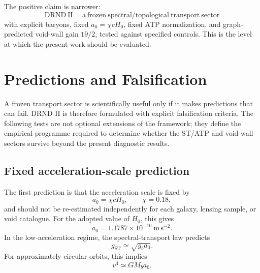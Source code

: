 \documentclass[12pt]{iopart}
\begin{document}
The positive claim is narrower:
\begin{equation}
\mathrm{DRND\ II}
=
\mathrm{a\ frozen\ spectral/topological\ transport\ sector}
\end{equation}
with explicit baryons, fixed \(a_0=\chi cH_0\), fixed ATP normalization, and graph-predicted void-wall gain \(19/2\), tested against specified controls. This is the level at which the present work should be evaluated.

\section{Predictions and Falsification}
\label{sec:falsification}

A frozen transport sector is scientifically useful only if it makes predictions that can fail. DRND II is therefore formulated with explicit falsification criteria. The following tests are not optional extensions of the framework; they define the empirical programme required to determine whether the ST/ATP and void-wall sectors survive beyond the present diagnostic results.

\subsection{Fixed acceleration-scale prediction}

The first prediction is that the acceleration scale is fixed by
\begin{equation}
a_0=\chi cH_0,
\qquad
\chi=0.18,
\end{equation}
and should not be re-estimated independently for each galaxy, lensing sample, or void catalogue. For the adopted value of \(H_0\), this gives
\begin{equation}
a_0
=
1.1787\times10^{-10}~\mathrm{m\,s^{-2}}.
\end{equation}
In the low-acceleration regime, the spectral-transport law predicts
\begin{equation}
g_{\mathrm{ST}}\simeq \sqrt{g_ba_0}.
\end{equation}
For approximately circular orbits, this implies
\begin{equation}
v^4\simeq GM_ba_0.
\end{equation}
\end{document}
